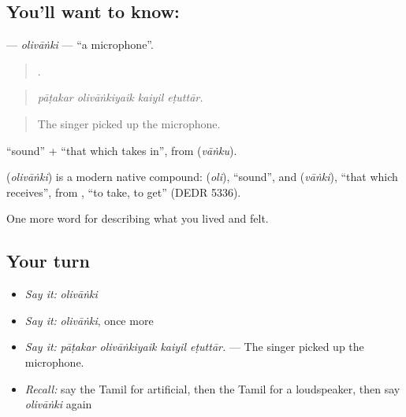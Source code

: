 \subsection*{You'll want to know: }
\textbf{} — \emph{olivāṅki} — \textquotedblleft{}a microphone\textquotedblright{}.

\begin{quote}
   .
\end{quote}

\begin{quote}
\emph{pāṭakar olivāṅkiyaik kaiyil eṭuttār.}
\end{quote}

\begin{quote}
The singer picked up the microphone.
\end{quote}

 \textquotedblleft{}sound\textquotedblright{} +  \textquotedblleft{}that which takes in\textquotedblright{}, from  (\emph{vāṅku}).

\begin{cousinweb}
\textbf{} (\emph{olivāṅki}) is a modern native compound:  (\emph{oli}), \textquotedblleft{}sound\textquotedblright{}, and  (\emph{vāṅki}), \textquotedblleft{}that which receives\textquotedblright{}, from , \textquotedblleft{}to take, to get\textquotedblright{} (DEDR 5336).
\end{cousinweb}

\begin{grammarlens}[title={What you've built}]
One more word for describing what you lived and felt.
\end{grammarlens}

\subsection*{Your turn}
\begin{itemize}
\raggedright
  \item \emph{Say it:} \emph{olivāṅki}
  \item \emph{Say it:} \emph{olivāṅki}, once more
  \item \emph{Say it:} \emph{pāṭakar olivāṅkiyaik kaiyil eṭuttār.} — The singer picked up the microphone.
  \item \emph{Recall:} say the Tamil for artificial, then the Tamil for a loudspeaker, then say \emph{olivāṅki} again
\end{itemize}

